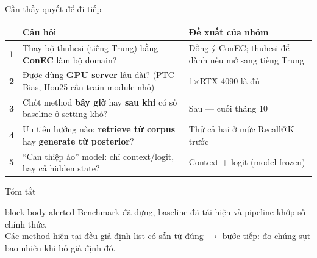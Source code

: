 \documentclass[aspectratio=169,xcolor=table]{beamer}
\newcommand{\hi}[1]{\textcolor{Primary}{\textbf{#1}}}
\begin{document}
\begin{frame}{Cần thầy quyết để đi tiếp}
\renewcommand{\arraystretch}{1.3}
\begin{tabular}{@{}cp{7.2cm}p{4.6cm}@{}}
\toprule
& \textbf{Câu hỏi} & \textbf{Đề xuất của nhóm}\\
\midrule
\hi{1} & Thay bộ thuhcsi (tiếng Trung) bằng \textbf{ConEC} làm bộ domain? & Đồng ý ConEC; thuhcsi để dành nếu mở sang tiếng Trung\\
\hi{2} & Được dùng \textbf{GPU server} lâu dài? (PTC-Bias, Hou25 cần train module nhỏ) & 1$\times$RTX 4090 là đủ\\
\hi{3} & Chốt method \textbf{bây giờ} hay \textbf{sau khi} có số baseline ở setting khó? & Sau --- cuối tháng 10\\
\hi{4} & Ưu tiên hướng nào: \textbf{retrieve từ corpus} hay \textbf{generate từ posterior}? & Thử cả hai ở mức Recall@K trước\\
\hi{5} & ``Can thiệp ảo'' model: chỉ context/logit, hay cả hidden state? & Context + logit (model frozen)\\
\bottomrule
\end{tabular}
\end{frame}

\begin{frame}{Tóm tắt}
\begin{center}
\end{center}
\vspace{0.3cm}
\begin{beamercolorbox}[sep=0.55em,center,rounded=true]{block body alerted}
Benchmark đã dựng, baseline đã tái hiện và pipeline khớp số chính thức.\\
Các method hiện tại đều giả định list có sẵn từ đúng $\rightarrow$ bước tiếp: đo chúng sụt bao nhiêu khi bỏ giả định đó.
\end{beamercolorbox}
\end{frame}
\end{document}

